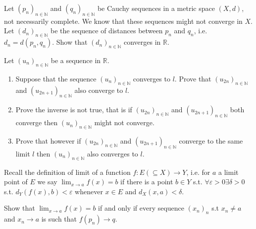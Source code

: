 \documentclass[11pt]{article}%
\begin{document}
\begin{Exercise}[title= **$\dagger$]
Let $(p_n)_{n\in\mathbb{N}}$ and $(q_n)_{n\in\mathbb{N}}$ be Cauchy sequences in a metric space $(X,d)$, not necessarily complete. We know that these sequences might not converge in $X$. Let $(d_n)_{n\in\mathbb{N}}$ be the sequence of distances between $p_n$ and $q_n$, i.e.  $d_n=d(p_n,q_n)$. Show that $(d_n)_{n\in\mathbb{N}}$ converges in $\mathbb R$.
\end{Exercise}

\begin{Exercise}[title=**$\dagger$]
	Let $(u_n)_{n\in\mathbb{N}}$ be a sequence in $\mathbb{R}$.
	\begin{enumerate}
		\item Suppose that the sequence $(u_n)_{n\in\mathbb{N}}$ converges to $l$. Prove that $(u_{2n})_{n\in\mathbb{N}}$ and $(u_{2n+1})_{n\in\mathbb{N}}$ also converge to $l$. 
		\item Prove the inverse is not true, that is if $(u_{2n})_{n\in\mathbb{N}}$ and $(u_{2n+1})_{n\in\mathbb{N}}$ both converge then $(u_n)_{n\in\mathbb{N}}$ might not converge.
		\item Prove that however if $(u_{2n})_{n\in\mathbb{N}}$ and $(u_{2n+1})_{n\in\mathbb{N}}$ converge to the same limit $l$ then $(u_n)_{n\in\mathbb{N}}$ also converges to $l$.
	\end{enumerate}
\end{Exercise}

\begin{Exercise}[title=**$\dagger$]
	Recall the definition of limit of a function $f:E(\subseteq X)\to Y$, i.e. for $a$ a limit point of $E$ we say $\lim_{x\rightarrow a} f(x) = b$ if there is a point $b\in Y$ s.t. $\forall\varepsilon>0\exists\delta>0$ s.t. $d_Y(f(x),b)<\varepsilon$ whenever $x\in E$ and $d_X(x,a)<\delta$.
	
	Show that $\lim_{x\rightarrow a} f(x) = b$ if and only if every sequence $(x_n)_n$ s.t $x_n\neq a$ and $x_n\to a$ is such that $f(p_n)\to q$.
\end{Exercise}
\end{document}

